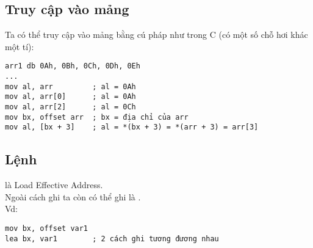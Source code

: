 \documentclass[main.tex]{subfiles}
\begin{document}
\subsection{Truy cập vào mảng}
Ta có thể truy cập vào mảng bằng cú pháp như trong C (có một số chỗ hơi khác một tí):
\begin{verbatim}
arr1 db 0Ah, 0Bh, 0Ch, 0Dh, 0Eh 
... 
mov al, arr         ; al = 0Ah 
mov al, arr[0]      ; al = 0Ah 
mov al, arr[2]      ; al = 0Ch 
mov bx, offset arr  ; bx = địa chỉ của arr
mov al, [bx + 3]    ; al = *(bx + 3) = *(arr + 3) = arr[3]
\end{verbatim}

\subsection{Lệnh }
 là Load Effective Address.\\
Ngoài cách ghi  ta còn có thể ghi là .\\
Vd:
\begin{verbatim}
mov bx, offset var1 
lea bx, var1        ; 2 cách ghi tương đương nhau
\end{verbatim}
\end{document}
